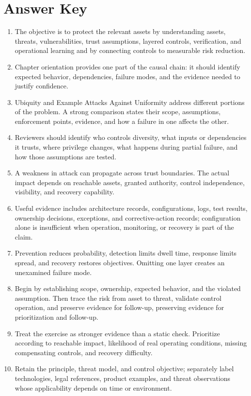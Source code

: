 \documentclass[11pt,letterpaper]{article}
\begin{document}
\section*{Answer Key}
\begin{enumerate}
\item The objective is to protect the relevant assets by understanding assets, threats, vulnerabilities, trust assumptions, layered controls, verification, and operational learning and by connecting controls to measurable risk reduction.
\item Chapter orientation provides one part of the causal chain: it should identify expected behavior, dependencies, failure modes, and the evidence needed to justify confidence.
\item Ubiquity and Example Attacks Against Uniformity address different portions of the problem. A strong comparison states their scope, assumptions, enforcement points, evidence, and how a failure in one affects the other.
\item Reviewers should identify who controls diversity, what inputs or dependencies it trusts, where privilege changes, what happens during partial failure, and how those assumptions are tested.
\item A weakness in attack can propagate across trust boundaries. The actual impact depends on reachable assets, granted authority, control independence, visibility, and recovery capability.
\item Useful evidence includes architecture records, configurations, logs, test results, ownership decisions, exceptions, and corrective-action records; configuration alone is insufficient when operation, monitoring, or recovery is part of the claim.
\item Prevention reduces probability, detection limits dwell time, response limits spread, and recovery restores objectives. Omitting one layer creates an unexamined failure mode.
\item Begin by establishing scope, ownership, expected behavior, and the violated assumption. Then trace the risk from asset to threat, validate control operation, and preserve evidence for follow-up, preserving evidence for prioritization and follow-up.
\item Treat the exercise as stronger evidence than a static check. Prioritize according to reachable impact, likelihood of real operating conditions, missing compensating controls, and recovery difficulty.
\item Retain the principle, threat model, and control objective; separately label technologies, legal references, product examples, and threat observations whose applicability depends on time or environment.
\end{enumerate}
\end{document}
